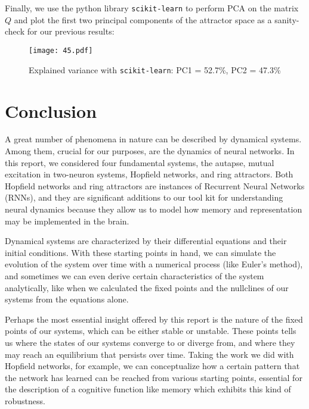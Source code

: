 \documentclass{article}
\begin{document}
\section{}
Finally, we use the python library \texttt{scikit-learn} to perform PCA on the matrix $Q$ and plot the first two principal components of the attractor space as a sanity-check for our previous results:

\begin{figure}[ht]
    \centering
    \texttt{[image: 45.pdf]}
    \caption{Explained variance with \texttt{scikit-learn}: PC1 = 52.7\%, PC2 = 47.3\%}
\end{figure}
\vspace{1em}


\newpage
\section*{Conclusion}
A great number of phenomena in nature can be described by dynamical systems. Among them, crucial for our purposes, are the dynamics of neural networks. In this report, we considered four fundamental systems, the autapse, mutual excitation in two-neuron systems, Hopfield networks, and ring attractors. Both Hopfield networks and ring attractors are instances of Recurrent Neural Networks (RNNs), and they are significant additions to our tool kit for understanding neural dynamics because they allow us to model how memory and representation may be implemented in the brain. 
\vspace{1em}

Dynamical systems are characterized by their differential equations and their initial conditions. With these starting points in hand, we can simulate the evolution of the system over time with a numerical process (like Euler's method), and sometimes we can even derive certain characteristics of the system analytically, like when we calculated the fixed points and the nullclines of our systems from the equations alone.
\vspace{1em}

Perhaps the most essential insight offered by this report is the nature of the fixed points of our systems, which can be either stable or unstable. These points tells us where the states of our systems converge to or diverge from, and where they may reach an equilibrium that persists over time. Taking the work we did with Hopfield networks, for example, we can conceptualize how a certain pattern that the network has learned can be reached from various starting points, essential for the description of a cognitive function like memory which exhibits this kind of robustness. 
\end{document}
